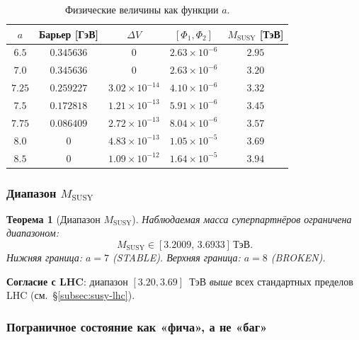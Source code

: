 \documentclass[11pt,a4paper]{article}
\newtheorem{theorem}{Теорема}[section]
\theoremstyle{definition}
\begin{document}
\begin{table}[ht]
\centering
\caption{Физические величины как функции \texorpdfstring{$a$}{a}.}
\label{tab:membrane-boundary-values}
\begin{tabular}{ccccc}
\toprule
$a$ & Барьер [ГэВ] & $\Delta V$ & $[\Phi_1, \Phi_2]$ & $M_{\text{SUSY}}$ [ТэВ] \\
\midrule
$6.5$  & $0.345636$ & $0$ & $2.63 \times 10^{-6}$ & $2.95$ \\
$7.0$  & $0.345636$ & $0$ & $2.63 \times 10^{-6}$ & $\mathbf{3.20}$ \\
$7.25$ & $0.259227$ & $3.02 \times 10^{-14}$ & $4.10 \times 10^{-6}$ & $3.32$ \\
$7.5$  & $0.172818$ & $1.21 \times 10^{-13}$ & $5.91 \times 10^{-6}$ & $3.45$ \\
$7.75$ & $0.086409$ & $2.72 \times 10^{-13}$ & $8.04 \times 10^{-6}$ & $3.57$ \\
$8.0$  & $0$ & $4.83 \times 10^{-13}$ & $1.05 \times 10^{-5}$ & $\mathbf{3.69}$ \\
$8.5$  & $0$ & $1.09 \times 10^{-12}$ & $1.64 \times 10^{-5}$ & $3.94$ \\
\bottomrule
\end{tabular}
\end{table}

\subsubsection{Диапазон \texorpdfstring{$M_{\text{SUSY}}$}{M\_SUSY}}

\begin{theorem}[Диапазон $M_{\text{SUSY}}$]
\label{thm:membrane-MSUSY-range}
Наблюдаемая масса суперпартнёров ограничена диапазоном:
\begin{equation}
    \boxed{
    M_{\text{SUSY}} \in [3.2009, \, 3.6933] \, \text{ТэВ}.
    }
    \label{eq:membrane-MSUSY-range}
\end{equation}
Нижняя граница: $a = 7$ (STABLE).
Верхняя граница: $a = 8$ (BROKEN).
\end{theorem}

\medskip\noindent
\textbf{Согласие с LHC}: диапазон $[3.20, 3.69]$~ТэВ
\emph{выше} всех стандартных пределов LHC (см.~\S\ref{subsec:susy-lhc}).

\subsubsection{Пограничное состояние как «фича», а не «баг»}
\end{document}
